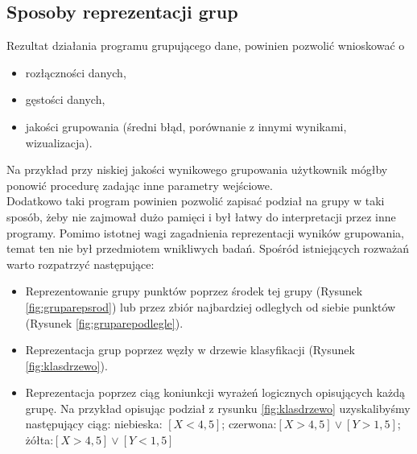 \documentclass{article}
\begin{document}
\subsection{Sposoby reprezentacji grup} \label{group_rep_section}

Rezultat działania programu grupującego dane, powinien pozwolić wnioskować o 
 \begin{itemize}
 	\item rozłączności danych,
 	\item gęstości danych,
 	\item jakości grupowania (średni błąd, porównanie z innymi wynikami, wizualizacja).
 \end{itemize}
 Na przykład przy niskiej jakości wynikowego grupowania użytkownik mógłby ponowić procedurę zadając inne parametry wejściowe. 
 \\
 Dodatkowo taki program powinien pozwolić zapisać podział na grupy w taki sposób, żeby nie zajmował dużo pamięci i był łatwy do interpretacji przez inne programy. Pomimo istotnej wagi zagadnienia reprezentacji wyników grupowania, temat ten nie był \cite[5.6]{jain_clustering} przedmiotem wnikliwych badań. Spośród istniejących rozważań warto rozpatrzyć następujące:

\begin{itemize}
	\item Reprezentowanie grupy punktów poprzez środek tej grupy (Rysunek \ref{fig:gruparepsrod}) lub przez zbiór najbardziej odległych od siebie punktów (Rysunek \ref{fig:gruparepodlegle}).
	\item Reprezentacja grup poprzez węzły w drzewie klasyfikacji (Rysunek \ref{fig:klasdrzewo}).
	\item Reprezentacja poprzez ciąg koniunkcji wyrażeń logicznych opisujących każdą grupę. Na przykład opisując podział z rysunku \ref{fig:klasdrzewo} uzyskalibyśmy następujący ciąg:
    niebieska: $[X<4,5]$; czerwona:$[X>4,5]\vee[Y>1,5]$; żółta:$[X>4,5]\vee[Y<1,5]$
\end{itemize}
\end{document}

